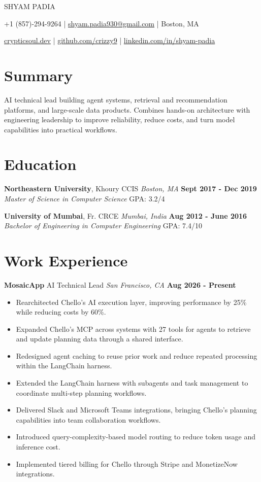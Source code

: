 \documentclass[10pt, letterpaper]{article}
\newcommand{\name}[1]{\centerline{\Large \scshape {#1}}}
\newcommand{\contactinfo}[1]{\centerline{\small #1}}
\newcommand{\educationentry}[4]{
  \noindent\textbf{#1}, #2 \hfill \textit{#3} \hfill \textbf{#4}
}
\newcommand{\jobentry}[4]{
  \noindent\textbf{#1} \hfill #2 \hfill \textit{#3} \hfill \textbf{#4}
}
\begin{document}
\name{SHYAM PADIA}
\contactinfo{
	+1 (857)-294-9264 |
	\href{mailto:shyam.padia930@gmail.com}{shyam.padia930@gmail.com} |
	Boston, MA
}
\contactinfo{
	\href{https://crypticsoul.dev}{crypticsoul.dev} |
	\href{https://github.com/crizzy9}{github.com/crizzy9} |
	\href{https://linkedin.com/in/shyam-padia}{linkedin.com/in/shyam-padia}
}

\section{Summary}
AI technical lead building agent systems, retrieval and recommendation platforms, and large-scale data products. Combines hands-on architecture with engineering leadership to improve reliability, reduce costs, and turn model capabilities into practical workflows.

\section{Education}

\educationentry{Northeastern University}{Khoury CCIS}{Boston, MA}{Sept 2017 - Dec 2019}\\
\textit{Master of Science in Computer Science} \hfill GPA: 3.2/4


\educationentry{University of Mumbai}{Fr. CRCE}{Mumbai, India}{Aug 2012 - June 2016}\\
\textit{Bachelor of Engineering in Computer Engineering} \hfill GPA: 7.4/10

\section{Work Experience}

\jobentry{MosaicApp}{AI Technical Lead}{San Francisco, CA}{Aug 2026 - Present}
\begin{itemize}
\item Rearchitected Chello's AI execution layer, improving performance by 25\% while reducing costs by 60\%.
\item Expanded Chello's MCP across systems with 27 tools for agents to retrieve and update planning data through a shared interface.
\item Redesigned agent caching to reuse prior work and reduce repeated processing within the LangChain harness.
\item Extended the LangChain harness with subagents and task management to coordinate multi-step planning workflows.
\item Delivered Slack and Microsoft Teams integrations, bringing Chello's planning capabilities into team collaboration workflows.
\item Introduced query-complexity-based model routing to reduce token usage and inference cost.
\item Implemented tiered billing for Chello through Stripe and MonetizeNow integrations.
\end{itemize}
\end{document}
